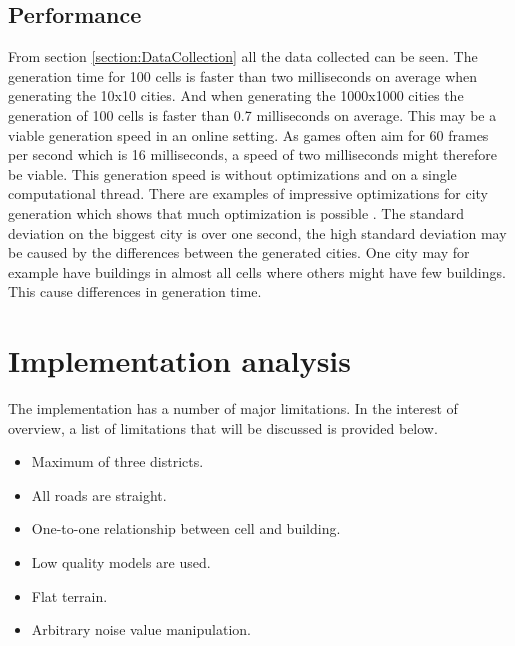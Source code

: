 	\subsection{Performance}
		From section \ref{section:DataCollection} all the data collected can be seen. The generation time for 100 cells is faster than two milliseconds on average when generating the 10x10 cities. And when generating the 1000x1000 cities the generation of 100 cells is faster than 0.7 milliseconds on average. This may be a viable generation speed in an online setting. As games often aim for 60 frames per second which is 16 milliseconds, a speed of two milliseconds might therefore be viable. This generation speed is without optimizations and on a single computational thread. There are examples of impressive optimizations for city generation which shows that much optimization is possible \cite{InfiniteCities}.
		The standard deviation on the biggest city is over one second, the high standard deviation may be caused by the differences between the generated cities. One city may for example have buildings in almost all cells where others might have few buildings. This cause differences in generation time.
		
\section{Implementation analysis}
The implementation has a number of major limitations. In the interest of overview, a list of limitations that will be discussed is provided below.
	
\begin{itemize}
	\setlength\itemsep{0.01cm}
	\item Maximum of three districts.
	\item All roads are straight.
	\item One-to-one relationship between cell and building.
	\item Low quality models are used.
	\item Flat terrain.
	\item Arbitrary noise value manipulation.
\end{itemize}
	
